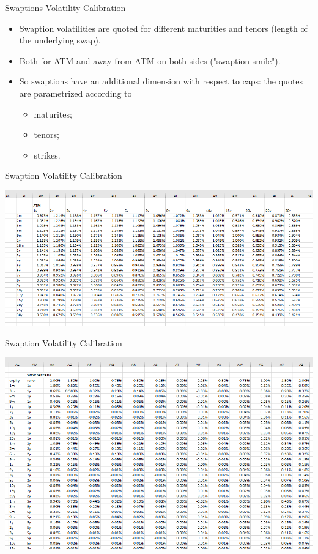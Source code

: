 \documentclass{beamer}
\begin{document}
\begin{frame}{Swaptions Volatility Calibration}
\begin{itemize}
	\item Swaption volatilities are quoted for different maturities and tenors (length of the underlying swap).
	\item Both for ATM and away from ATM on both sides ("swaption smile").
	\item So swaptions have an additional dimension with respect to caps: the quotes are parametrized according to 
	\begin{itemize}
		\item maturites;
		\item tenors;
		\item strikes.
	\end{itemize}
\end{itemize}
\end{frame}

\begin{frame}{Swaption Volatility Calibration}
  \begin{center}
    \includegraphics[width=1.\linewidth]{atm_vol}
  \end{center}
\end{frame}

\begin{frame}{Swaption Volatility Calibration}
  \begin{center}
    \includegraphics[width=1.\linewidth]{skews}
  \end{center}
\end{frame}
\end{document}
